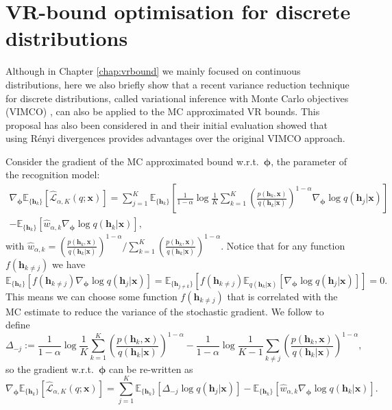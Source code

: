 \section{VR-bound optimisation for discrete distributions}

Although in Chapter \ref{chap:vrbound} we mainly focused on continuous distributions, here we also briefly show that a recent variance reduction technique for discrete distributions, called variational inference with Monte Carlo objectives (VIMCO) \citep{mnih:vimco2016}, can also be applied to the MC approximated VR bounds. This proposal has also been considered in \citet{webb:alpha_vimco2016} and their initial evaluation showed that using R{\'e}nyi divergences provides advantages over the original VIMCO approach. 

Consider the gradient of the MC approximated bound w.r.t.~$\bm{\phi}$, the parameter of the recognition model:
\begin{equation*}
\begin{aligned}
\nabla_{\bm{\phi}} \mathbb{E}_{ \{\bm{h}_k\} }[\hat{\mathcal{L}}_{\alpha, K}(q; \bm{x})] = \sum_{j=1}^K \mathbb{E}_{\{\bm{h}_k\}}\left[ \frac{1}{1 - \alpha} \log \frac{1}{K}\sum_{k=1}^K \left( \frac{p(\bm{h}_k, \bm{x}) }{q(\bm{h}_k|\bm{x})}\right)^{1 - \alpha} \nabla_{\bm{\phi}} \log q(\bm{h}_j|\bm{x}) \right] \\
-\mathbb{E}_{\{\bm{h}_k\}} \left[ \hat{w}_{\alpha, k} \nabla_{\bm{\phi}} \log q(\bm{h}_k|\bm{x}) \right],
\end{aligned}
\end{equation*}
with $\hat{w}_{\alpha, k} = \left( \frac{p(\bm{h}_k, \bm{x}) }{q(\bm{h}_k|\bm{x})}\right)^{1 - \alpha} / \sum_{k=1}^K \left( \frac{p(\bm{h}_k, \bm{x}) }{q(\bm{h}_k|\bm{x})}\right)^{1 - \alpha}$. Notice that for any function $f(\bm{h}_{k \neq j})$ we have 
$$\mathbb{E}_{ \{ \bm{h}_k \} } [ f(\bm{h}_{k \neq j}) \nabla_{\bm{\phi}} \log q(\bm{h}_j|\bm{x}) ] = \mathbb{E}_{ \{ \bm{h}_{j \neq k} \} } [ f(\bm{h}_{k \neq j}) \mathbb{E}_{q(\bm{h}_k|\bm{x})}[ \nabla_{\bm{\phi}} \log q(\bm{h}_j|\bm{x})] ] = 0.$$
This means we can choose some function $f(\bm{h}_{k \neq j})$ that is correlated with the MC estimate to reduce the variance of the stochastic gradient. We follow \cite{mnih:vimco2016} to define
\begin{equation*}
\Delta_{-j} := \frac{1}{1 - \alpha} \log \frac{1}{K}\sum_{k=1}^K \left( \frac{p(\bm{h}_k, \bm{x}) }{q(\bm{h}_k|\bm{x})}\right)^{1 - \alpha} - \frac{1}{1 - \alpha} \log \frac{1}{K-1}\sum_{k \neq j} \left( \frac{p(\bm{h}_k, \bm{x}) }{q(\bm{h}_k|\bm{x})}\right)^{1 - \alpha},
\end{equation*}
so the gradient w.r.t.~$\bm{\phi}$ can be re-written as
\begin{equation}
\nabla_{\bm{\phi}} \mathbb{E}_{ \{\bm{h}_k\} }[\hat{\mathcal{L}}_{\alpha, K}(q; \bm{x})] = \sum_{j=1}^K \mathbb{E}_{\{\bm{h}_k\}}\left[ \Delta_{-j} \log q(\bm{h}_j|\bm{x}) \right] -\mathbb{E}_{\{\bm{h}_k\}} \left[ \hat{w}_{\alpha, k} \nabla_{\bm{\phi}} \log q(\bm{h}_k|\bm{x}) \right].
\end{equation}

